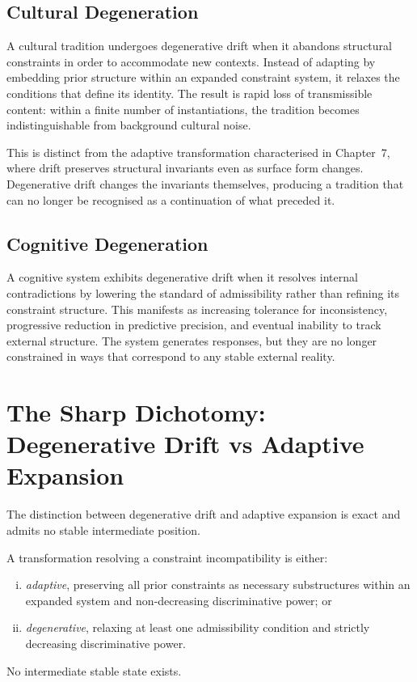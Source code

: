 \documentclass[11pt,openany]{book}
\begin{document}
\subsection{Cultural Degeneration}
\label{subsec:cultural}

A cultural tradition undergoes degenerative drift when it
abandons structural constraints in order to accommodate new
contexts.  Instead of adapting by embedding prior structure
within an expanded constraint system, it relaxes the
conditions that define its identity.  The result is rapid
loss of transmissible content: within a finite number of
instantiations, the tradition becomes indistinguishable
from background cultural noise.

This is distinct from the adaptive transformation
characterised in Chapter~7, where drift preserves
structural invariants even as surface form changes.
Degenerative drift changes the invariants themselves,
producing a tradition that can no longer be recognised as
a continuation of what preceded it.

\subsection{Cognitive Degeneration}
\label{subsec:cognitive}

A cognitive system exhibits degenerative drift when it
resolves internal contradictions by lowering the standard
of admissibility rather than refining its constraint
structure.  This manifests as increasing tolerance for
inconsistency, progressive reduction in predictive
precision, and eventual inability to track external
structure.  The system generates responses, but they are
no longer constrained in ways that correspond to any
stable external reality.

\section{The Sharp Dichotomy: Degenerative Drift
  vs Adaptive Expansion}
\label{sec:comparison}

The distinction between degenerative drift and adaptive
expansion is exact and admits no stable intermediate
position.

\begin{proposition}
\label{prop:dichotomy}
A transformation resolving a constraint incompatibility is
either:
\begin{enumerate}[(i)]
  \item \emph{adaptive}, preserving all prior constraints as
    necessary substructures within an expanded system and
    non-decreasing discriminative power; or
  \item \emph{degenerative}, relaxing at least one
    admissibility condition and strictly decreasing
    discriminative power.
\end{enumerate}
No intermediate stable state exists.
\end{proposition}
\end{document}
